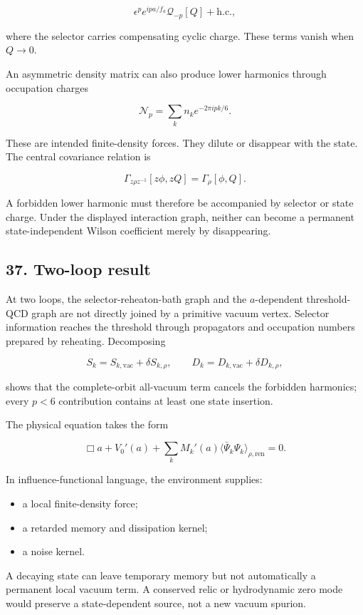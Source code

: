 \documentclass[
]{article}
\providecommand{\tightlist}{%
  \setlength{\itemsep}{0pt}\setlength{\parskip}{0pt}}
\begin{document}
\[
\epsilon^p e^{ipa/f_a}\mathcal Q_{-p}[Q]+\mathrm{h.c.},
\]

where the selector carries compensating cyclic charge. These terms
vanish when \(Q\rightarrow0\).

An asymmetric density matrix can also produce lower harmonics through
occupation charges

\[
\mathcal N_p=\sum_kn_ke^{-2\pi ipk/6}.
\]

These are intended finite-density forces. They dilute or disappear with
the state. The central covariance relation is

\[
\Gamma_{z\rho z^{-1}}[z\phi,zQ]
=\Gamma_\rho[\phi,Q].
\]

A forbidden lower harmonic must therefore be accompanied by selector or
state charge. Under the displayed interaction graph, neither can become
a permanent state-independent Wilson coefficient merely by disappearing.

\subsection{37. Two-loop result}\label{two-loop-result}

At two loops, the selector-reheaton-bath graph and the \(a\)-dependent
threshold-QCD graph are not directly joined by a primitive vacuum
vertex. Selector information reaches the threshold through propagators
and occupation numbers prepared by reheating. Decomposing

\[
S_k=S_{k,\mathrm{vac}}+\delta S_{k,\rho},
\qquad
D_k=D_{k,\mathrm{vac}}+\delta D_{k,\rho},
\]

shows that the complete-orbit all-vacuum term cancels the forbidden
harmonics; every \(p<6\) contribution contains at least one state
insertion.

The physical equation takes the form

\[
\Box a+V_0'(a)
+\sum_kM_k'(a)\langle\bar\Psi_k\Psi_k\rangle_{\rho,\mathrm{ren}}=0.
\]

In influence-functional language, the environment supplies:

\begin{itemize}
\tightlist
\item
  a local finite-density force;
\item
  a retarded memory and dissipation kernel;
\item
  a noise kernel.
\end{itemize}

A decaying state can leave temporary memory but not automatically a
permanent local vacuum term. A conserved relic or hydrodynamic zero mode
would preserve a state-dependent source, not a new vacuum spurion.
\end{document}
